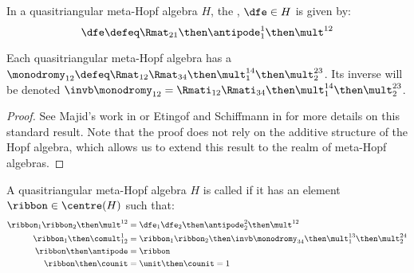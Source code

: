 \begin{definition}
        In a quasitriangular meta-Hopf algebra $H$, the ,
        $\dfe \in H$ is given by:
        \begin{equation}
                \dfe \defeq \Rmat_{21}\then\antipode^1_1 \then \mult^{12}
        \end{equation}
\end{definition}

\begin{definition}[monodromy]
        Each quasitriangular meta-Hopf algebra has a 
        $\monodromy_{12} \defeq
        \Rmat_{12}\Rmat_{34}\then\mult^{14}_{1}\then\mult^{23}_{2}$. Its
        inverse will be denoted
        $\invb\monodromy_{12} =
        \Rmati_{12}\Rmati_{34}\then\mult^{14}_{1}\then\mult^{23}_{2}$.
\end{definition}

\begin{proof}
        See Majid's work in \cite{SM} or Etingof and Schiffmann in \cite{ES}
        for more details on this standard result. Note that the proof does not
        rely on the additive structure of the Hopf algebra, which allows us to
        extend this result to the realm of meta-Hopf algebras.
\end{proof}

\begin{definition}
        A quasitriangular meta-Hopf algebra $H$ is called  if it has an
        element $\ribbon\in \centre(H)$ such that:
        \begin{align}
                \ribbon_1\ribbon_2\then\mult^{12}
                &= \dfe_1 \dfe_2 \then \antipode^{2}_{2} \then \mult^{12}\\
                \ribbon_1 \then \comult^1_{12}
                &=      \ribbon_1\ribbon_2
                        \then\invb\monodromy_{34}
                        \then\mult^{13}_{1}
                        \then\mult^{24}_{2} \\
                \ribbon \then \antipode &= \ribbon\\
                \ribbon \then \counit &= \unit \then \counit = 1
        \end{align}
\end{definition}

